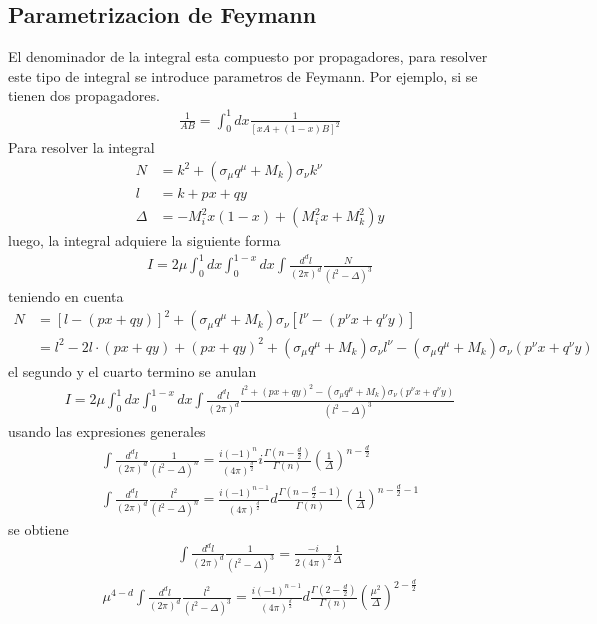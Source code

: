 \subsection{Parametrizacion de Feymann}
El denominador de la integral esta compuesto por propagadores, para resolver este tipo de integral se introduce parametros de Feymann. Por ejemplo, si se tienen dos propagadores.
\begin{align}
\frac{1}{AB}=\int_0^1 dx\frac{1}{[xA+(1-x)B]^2}
\end{align}
Para resolver la integral
\begin{align}
N&=k^2+(\sigma_{\mu}q^{\mu}+M_{k})\sigma_{\nu}k^{\nu}\nonumber\\
l&=k+px+qy\nonumber\\
\Delta&=-M_{i}^2x(1-x)+(M_{i}^2x+M_{k}^{2})y
\end{align}
luego, la integral adquiere la siguiente forma
\begin{align}
I=2\mu\int_0^1dx\int_0^{1-x}dx\int\frac{d^dl}{(2\pi)^d}\frac{N}{(l^2-\Delta)^3}
\end{align}
teniendo en cuenta
\begin{align}
N&=[l-(px+qy)]^2+(\sigma_{\mu}q^{\mu}+M_{k})\sigma_{\nu}[l^{\nu}-(p^{\nu}x+q^{\nu}y)]\nonumber\\
&=l^2-2l\cdot(px+qy)+(px+qy)^2+(\sigma_{\mu}q^{\mu}+M_{k})\sigma_{\nu}l^{\nu}-(\sigma_{\mu}q^{\mu}+M_{k})\sigma_{\nu}(p^{\nu}x+q^{\nu}y)
\end{align}
el segundo y el cuarto termino se anulan
\begin{align}
I=2\mu\int_0^1dx\int_0^{1-x}dx\int\frac{d^dl}{(2\pi)^d}\frac{l^2+(px+qy)^2-(\sigma_{\mu}q^{\mu}+M_{k})\sigma_{\nu}(p^{\nu}x+q^{\nu}y)}{(l^2-\Delta)^3}
\end{align}
usando las expresiones generales
\begin{align}
\int\frac{d^dl}{(2\pi)^d}\frac{1}{(l^2-\Delta)^n}=\frac{i(-1)^n}{(4\pi)^{\frac{d}{2}}}i\frac{\Gamma(n-\frac{d}{2})}{\Gamma(n)}\left(\frac{1}{\Delta}\right)^{n-\frac{d}{2}}\nonumber\\
\int\frac{d^dl}{(2\pi)^d}\frac{l^2}{(l^2-\Delta)^n}=\frac{i(-1)^{n-1}}{(4\pi)^{\frac{d}{2}}}d\frac{\Gamma(n-\frac{d}{2}-1)}{\Gamma(n)}\left(\frac{1}{\Delta}\right)^{n-\frac{d}{2}-1}
\end{align}
se obtiene
\begin{align}
\int\frac{d^dl}{(2\pi)^d}\frac{1}{(l^2-\Delta)^3}=\frac{-i}{2(4\pi)^2}\frac{1}{\Delta}
\end{align}
\begin{align}
\mu^{4-d}\int\frac{d^dl}{(2\pi)^d}\frac{l^2}{(l^2-\Delta)^3}=\frac{i(-1)^{n-1}}{(4\pi)^{\frac{d}{2}}}d\frac{\Gamma(2-\frac{d}{2})}{\Gamma(n)}\left(\frac{\mu^2}{\Delta}\right)^{2-\frac{d}{2}}
\end{align}
